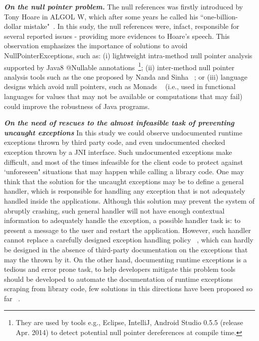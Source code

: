 \documentclass[conference]{IEEEtran}
\begin{document}

\emph{\textbf{On the null pointer problem.}}
The null references was firstly introduced by Tony Hoare in ALGOL W, which after some years he called his ``one-billion-dollar mistake"~\cite{hoare2}.
In this sudy, the null references were, infact, responsible for several reported issues - providing more evidences to Hoare's speech.
This observation emphasizes the importance of solutions to avoid NullPointerExceptions, such as:
(i) lightweight intra-method null pointer analysis supported by Java8 @Nullable annotations~\footnote{They are used by tools e.g., Eclipse, IntelliJ, Android Studio 0.5.5 (release Apr. 2014) to detect potential 
null pointer dereferences at compile time.};
(ii) inter-method null pointer analysis tools such as the one proposed by Nanda and Sinha ~\cite{nanda2009accurate};
or (iii) language designs which avoid null pointers, such 
as Monads ~\cite{Walde95} (i.e., used in functional languages for values that may not be available 
or computations that may fail) could improve the robustness of Java programs. 

\emph{\textbf{On the need of rescues to the almost infeasible task of preventing uncaught exceptions}}
In this study we could observe undocumented runtime exceptions thrown by third party code,
and even undocumented checked exception thrown by a JNI interface.
Such undocumented exceptions make difficult, and most of the times infeasible
for the client code to protect against `unforeseen" situations that may happen 
while calling a library code. One may think that the solution for the uncaught exceptions may be to define a general handler, 
which is responsible for handling any exception that is not
adequately handled inside the applications. Although this 
solution may prevent  the system of abruptly crashing,
 such general handler will not have enough
contextual information to adequately handle the exception, 
a possible handler task is: to present a message to the user
 and restart the application. However, such handler cannot replace a carefully designed exception 
handling policy ~\cite{Robil00}, which can hardly be designed in the absence of 
third-party documentation on the exceptions that
may the thrown by it. On the other hand, documenting runtime exceptions is a tedious and error prone task, to help developers
mitigate this problem tools should be developed to automate the documentation of runtime exceptions
scraping from library code, few solutions in this directions have been proposed so far ~\cite{van2005combining}. 
\end{document}
